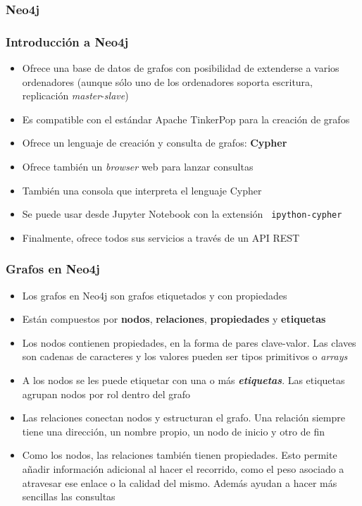 \documentclass[14pt]{beamer}
\begin{document}
\subsubsection{Neo4j}

\begin{frame}[allowframebreaks]
  \frametitle{Introducción a Neo4j}
\begin{itemize}
\item Ofrece una base de datos de grafos con posibilidad de extenderse a
  varios ordenadores (aunque sólo uno de los ordenadores soporta escritura,
  replicación {\em master}-{\em slave})
\item Es compatible con el estándar Apache TinkerPop para la creación de
  grafos
\item Ofrece un lenguaje de creación y consulta de grafos: {\bf Cypher}
\item Ofrece también un {\em browser\/} web para lanzar consultas
\item También una consola que interpreta el lenguaje Cypher
\item Se puede usar desde Jupyter Notebook con la extensión {\tt
    ipython-cypher}
\item Finalmente, ofrece todos sus servicios a través de un API REST
  \end{itemize}
\end{frame}

\begin{frame}[allowframebreaks]
  \frametitle{Grafos en Neo4j}
  \begin{itemize}
  \item Los grafos en Neo4j son grafos etiquetados y con propiedades
  \item Están compuestos por {\bf nodos}, {\bf relaciones}, {\bf
      propiedades} y {\bf etiquetas}
\item Los nodos contienen propiedades, en la forma de pares clave-valor.
  Las claves son cadenas de caracteres y los valores pueden ser tipos
  primitivos o {\em arrays}
\item A los nodos se les puede etiquetar con una o más {\bfseries\itshape
    etiquetas}. Las etiquetas agrupan nodos por rol dentro del grafo
\item Las relaciones conectan nodos y estructuran el grafo. Una relación
  siempre tiene una dirección, un nombre propio, un nodo de inicio y otro
  de fin
\item Como los nodos, las relaciones también tienen propiedades. Esto
  permite añadir información adicional al hacer el recorrido, como el peso
  asociado a atravesar ese enlace o la calidad del mismo. Además ayudan a
  hacer más sencillas las consultas
  \end{itemize}
\end{frame}
\end{document}
